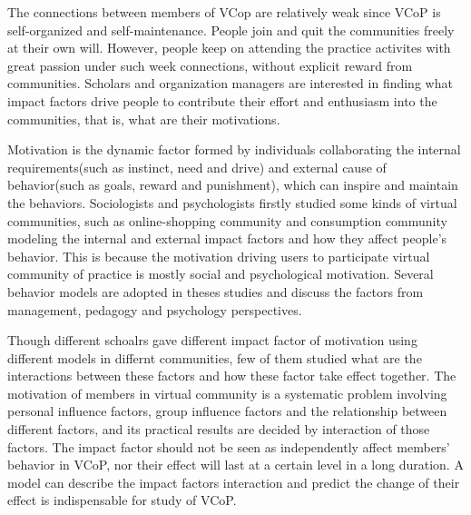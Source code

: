 \documentclass{elsarticle}
\begin{document}
The connections between members of  VCop are relatively weak since VCoP is
self-organized and self-maintenance. People join and quit the
communities freely at their own will. However, people keep on
attending the practice activites with great passion under such week
connections, without explicit reward from communities. Scholars and
organization managers are interested in finding what impact factors drive
people to contribute their effort and enthusiasm into the communities,
that is, what are their motivations.

Motivation is the dynamic factor formed by individuals collaborating the internal requirements(such as instinct, need and drive) and external cause of behavior(such as goals, reward and punishment), which can inspire and maintain the behaviors.
Sociologists and psychologists firstly studied some kinds of virtual
communities, such as online-shopping community and consumption community
modeling the internal and external impact factors and how they affect
people's behavior\cite{teo1999iae}\cite{shang2005evi}. This is because
the motivation  driving users to participate virtual community of
practice is mostly social and  psychological  motivation. Several
behavior  models
are adopted in theses studies and discuss the factors from management,
pedagogy and psychology perspectives.

Though different schoalrs gave different impact factor of motivation
using different models in differnt communities, few of them studied
what are the interactions between these factors and how these factor
take effect together. The motivation of members in virtual community is
a systematic problem involving personal influence factors, group
influence factors and the relationship between different factors, and
its practical results are decided by interaction of those factors. The
impact factor should not be seen as independently affect members'
behavior in VCoP, nor their effect will last at a certain level in a
long duration. A model can describe the impact factors interaction and
predict the change of their effect is indispensable for study of
VCoP. 
\end{document}
